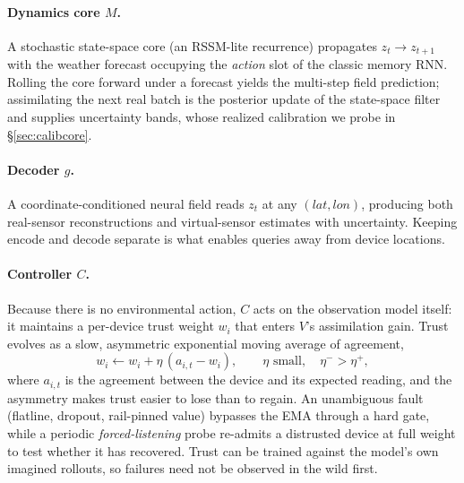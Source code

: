 \documentclass[10pt]{article}
\begin{document}
\paragraph{Dynamics core $M$.}
A stochastic state-space core (an RSSM-lite recurrence) propagates $z_t\to
z_{t+1}$ with the weather forecast occupying the \emph{action} slot of the
classic memory RNN. Rolling the core forward under a forecast yields the
multi-step field prediction; assimilating the next real batch is the posterior
update of the state-space filter and supplies uncertainty bands, whose realized
calibration we probe in \S\ref{sec:calibcore}.

\paragraph{Decoder $g$.}
A coordinate-conditioned neural field reads $z_t$ at any $(lat,lon)$, producing
both real-sensor reconstructions and virtual-sensor estimates with uncertainty.
Keeping encode and decode separate is what enables queries away from device
locations.

\paragraph{Controller $C$.}
Because there is no environmental action, $C$ acts on the observation model
itself: it maintains a per-device trust weight $w_i$ that enters $V$'s
assimilation gain. Trust evolves as a slow, asymmetric exponential moving average
of agreement,
\begin{equation}
w_i \leftarrow w_i + \eta\,(a_{i,t}-w_i), \qquad \eta \text{ small}, \quad
\eta^{-}>\eta^{+},
\label{eq:trust}
\end{equation}
where $a_{i,t}$ is the agreement between the device and its expected reading, and
the asymmetry makes trust easier to lose than to regain. An unambiguous fault
(flatline, dropout, rail-pinned value) bypasses the EMA through a hard gate, while
a periodic \emph{forced-listening} probe re-admits a distrusted device at full
weight to test whether it has recovered. Trust can be trained against the model's
own imagined rollouts, so failures need not be observed in the wild first.
\end{document}
